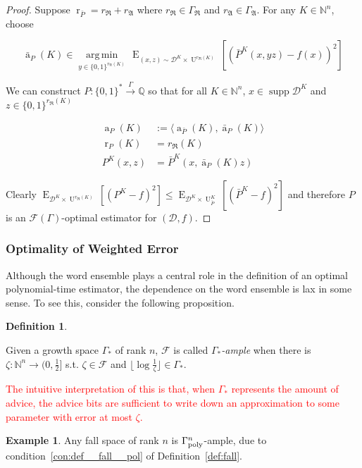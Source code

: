 \documentclass[11pt]{article}
\numberwithin{equation}{section}
\theoremstyle{definition}
\newtheorem{definition}{Definition}[section]
\newtheorem{example}{Example}[section]
\theoremstyle{plain}
\newcommand{\Bool}{\{0,1\}}
\newcommand{\Words}{{\Bool^*}}
\newcommand{\WordsLen}[1]{{\Bool^{#1}}}
\DeclareMathOperator{\Supp}{supp}
\DeclareMathOperator{\E}{E}
\DeclareMathOperator{\R}{r}
\DeclareMathOperator{\A}{a}
\DeclareMathOperator{\Un}{U}
\newcommand{\Argmin}[1]{\underset{#1}{\operatorname{arg\,min}}\,}
\newcommand{\Nats}{\mathbb{N}}
\newcommand{\Rats}{\mathbb{Q}}
\newcommand{\NatFun}{\Nats^n \rightarrow}
\newcommand{\Floor}[1]{\lfloor #1 \rfloor}
\newcommand{\Chev}[1]{\langle #1 \rangle}
\newcommand{\Dist}{\mathcal{D}}
\newcommand{\GrowR}{\Gamma_{\mathfrak{R}}}
\newcommand{\GrowA}{\Gamma_{\mathfrak{A}}}
\newcommand{\Fall}{\mathcal{F}}
\newcommand{\EG}{\Fall(\Gamma)}
\newcommand{\GammaPoly}{\Gamma_{\textnormal{poly}}}
\newcommand{\Scheme}{\xrightarrow{\Gamma}}
\begin{document}
\begin{proof}
Suppose $\R_{\bar{P}}=r_{\mathfrak{R}}+r_{\mathfrak{A}}$ where $r_{\mathfrak{R}} \in \GrowR$ and $r_{\mathfrak{A}} \in \GrowA$. For any ${K \in \Nats^n}$, choose 

\[\bar{\A}_P(K) \in \Argmin{y \in \WordsLen{r_{\mathfrak{A}}(K)}} \E_{(x,z) \sim \Dist^{K} \times \Un^{r_{\mathfrak{R}}(K)}}[(\bar{P}^{K}(x,yz) - f(x))^2]\]

We can construct $P: \Words \Scheme \Rats$ so that for all $K \in \Nats^n$, $x \in \Supp \Dist^{K}$ and ${z \in \WordsLen{r_{\mathfrak{R}}(K)}}$

\begin{align*}
\A_P(K) &:=\Chev{\A_{\bar{P}}(K),\bar{\A}_P(K)} \\
\R_P(K) &= r_{\mathfrak{R}}(K) \\
P^{K}(x,z) &=\bar{P}^{K}(x,\bar{\A}_P(K)z)
\end{align*}

Clearly ${\E_{\Dist^{K} \times \Un^{r_{\mathfrak{R}}(K)}}[(P^{K} - f)^2] \leq \E_{\Dist^{K} \times \Un_{\bar{P}}^{K}}[(\bar{P}^{K} - f)^2]}$ and therefore $P$ is an $\EG$-optimal estimator for $(\Dist,f)$.
\end{proof}

\subsubsection{Optimality of Weighted Error}

Although the word ensemble plays a central role in the definition of an optimal polynomial-time estimator, the dependence on the word ensemble is lax in some sense. To see this, consider the following proposition.

\begin{definition}
\label{def:ample}

Given a growth space $\Gamma_*$ of rank $n$, $\Fall$ is called \emph{$\Gamma_*$-ample} when there is\\ $\zeta: \NatFun (0,\frac{1}{2}]$ s.t.  $\zeta \in \Fall$ and $\Floor{\log \frac{1}{\zeta}} \in \Gamma_*$.

\end{definition}
\textcolor{red}{The intuitive interpretation of this is that, when $\Gamma_*$ represents the amount of advice, the advice bits are sufficient to write down an approximation to some parameter with error at most $\zeta$.}
\begin{samepage}
\begin{example}

Any fall space of rank ${n}$ is ${\GammaPoly^n}$-ample, due to condition~\ref{con:def__fall__pol} of Definition~\ref{def:fall}.

\end{example}
\end{samepage}
\end{document}
